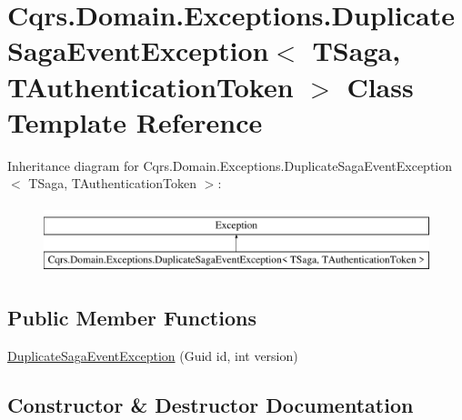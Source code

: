 \hypertarget{classCqrs_1_1Domain_1_1Exceptions_1_1DuplicateSagaEventException}{}\section{Cqrs.\+Domain.\+Exceptions.\+Duplicate\+Saga\+Event\+Exception$<$ T\+Saga, T\+Authentication\+Token $>$ Class Template Reference}
\label{classCqrs_1_1Domain_1_1Exceptions_1_1DuplicateSagaEventException}
Inheritance diagram for Cqrs.\+Domain.\+Exceptions.\+Duplicate\+Saga\+Event\+Exception$<$ T\+Saga, T\+Authentication\+Token $>$\+:\begin{figure}[H]
\begin{center}
\leavevmode
\includegraphics[height=2.000000cm]{classCqrs_1_1Domain_1_1Exceptions_1_1DuplicateSagaEventException}
\end{center}
\end{figure}
\subsection*{Public Member Functions}
\begin{DoxyCompactItemize}
\item 
\hyperlink{classCqrs_1_1Domain_1_1Exceptions_1_1DuplicateSagaEventException_af0a56394404b67c5cb5773d3bd6d1e8e_af0a56394404b67c5cb5773d3bd6d1e8e}{Duplicate\+Saga\+Event\+Exception} (Guid id, int version)
\end{DoxyCompactItemize}


\subsection{Constructor \& Destructor Documentation}
\mbox{\label{classCqrs_1_1Domain_1_1Exceptions_1_1DuplicateSagaEventException_af0a56394404b67c5cb5773d3bd6d1e8e_af0a56394404b67c5cb5773d3bd6d1e8e}} 
